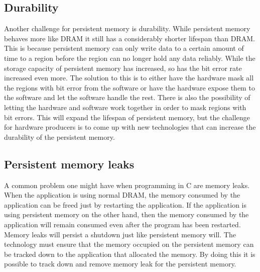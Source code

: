 \documentclass[12pt,a4paper,UKenglish]{article}
\begin{document}
\subsection{Durability}
Another challenge for persistent memory is durability. While persistent memory behaves more like DRAM it still has a considerably shorter lifespan than DRAM\cite{Badam}. This is because persistent memory can only write data to a certain amount of time to a region before the region can no longer hold any data reliably. While the storage capacity of persistent memory has increased, so has the bit error rate increased even more. The solution to this is to either have the hardware mask all the regions with bit error from the software or have the hardware expose them to the software and let the software handle the rest. There is also the possibility of letting the hardware and software work together in order to mask regions with bit errors. This will expand the lifespan of persistent memory, but the challenge for hardware producers is to come up with new technologies that can increase the durability of the persistent memory.

\subsection{Persistent memory leaks}
A common problem one might have when programming in C are memory leaks. When the application is using normal DRAM, the memory consumed by the application can be freed just by restarting the application. If the application is using persistent memory on the other hand, then the memory consumed by the application will remain consumed even after the program has been restarted.\cite{Volos}\cite{Swanson} Memory leaks will persist a shutdown just like persistent memory will. The technology must ensure that the memory occupied on the persistent memory can be tracked down to the application that allocated the memory. By doing this it is possible to track down and remove memory leak for the persistent memory.
\end{document}
